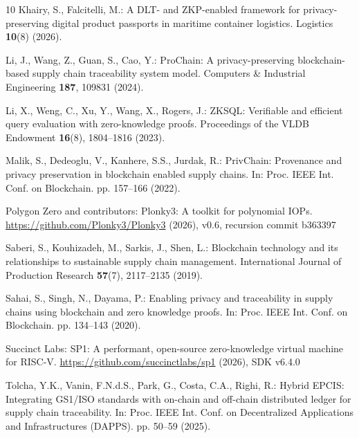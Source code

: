 \documentclass[runningheads]{llncs}
\begin{document}
\begin{thebibliography}{10}
Khairy, S., Falcitelli, M.: A {DLT}- and {ZKP}-enabled framework for
  privacy-preserving digital product passports in maritime container logistics.
  Logistics  \textbf{10}(8) (2026). 

Li, J., Wang, Z., Guan, S., Cao, Y.: {ProChain}: A privacy-preserving
  blockchain-based supply chain traceability system model. Computers \&
  Industrial Engineering  \textbf{187},  109831 (2024).

Li, X., Weng, C., Xu, Y., Wang, X., Rogers, J.: {ZKSQL}: Verifiable and
  efficient query evaluation with zero-knowledge proofs. Proceedings of the
  VLDB Endowment  \textbf{16}(8),  1804--1816 (2023).

Malik, S., Dedeoglu, V., Kanhere, S.S., Jurdak, R.: {PrivChain}: Provenance and
  privacy preservation in blockchain enabled supply chains. In: Proc. IEEE Int.
  Conf. on Blockchain. pp. 157--166 (2022).

{Polygon Zero and contributors}: {Plonky3}: A toolkit for polynomial {IOPs}.
  \url{https://github.com/Plonky3/Plonky3} (2026), v0.6, recursion commit
  b363397

Saberi, S., Kouhizadeh, M., Sarkis, J., Shen, L.: Blockchain technology and its
  relationships to sustainable supply chain management. International Journal
  of Production Research  \textbf{57}(7),  2117--2135 (2019).

Sahai, S., Singh, N., Dayama, P.: Enabling privacy and traceability in supply
  chains using blockchain and zero knowledge proofs. In: Proc. IEEE Int. Conf.
  on Blockchain. pp. 134--143 (2020). 

{Succinct Labs}: {SP1}: A performant, open-source zero-knowledge virtual
  machine for {RISC-V}. \url{https://github.com/succinctlabs/sp1} (2026), {SDK}
  v6.4.0

Tolcha, Y.K., Vanin, F.N.d.S., Park, G., Costa, C.A., Righi, R.: Hybrid
  {EPCIS}: Integrating {GS1/ISO} standards with on-chain and off-chain
  distributed ledger for supply chain traceability. In: Proc. IEEE Int. Conf.
  on Decentralized Applications and Infrastructures (DAPPS). pp. 50--59 (2025).


\end{thebibliography}
\end{document}
